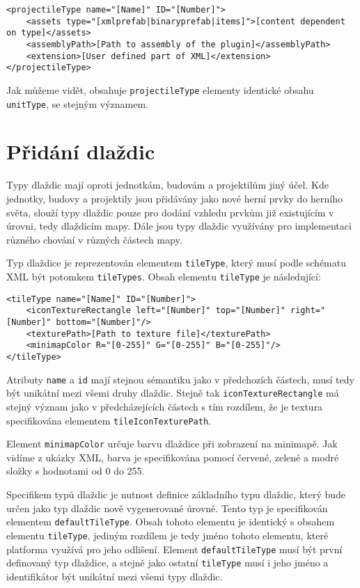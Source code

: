 \begin{lstlisting}
<projectileType name="[Name]" ID="[Number]">
	<assets type="[xmlprefab|binaryprefab|items]">[content dependent on type]</assets>
	<assemblyPath>[Path to assembly of the plugin]</assemblyPath>
	<extension>[User defined part of XML]</extension>
</projectileType>
\end{lstlisting}

Jak můžeme vidět, obsahuje \texttt{projectileType} elementy identické obsahu \texttt{unitType}, se stejným významem.
\section{Přidání dlaždic}
Typy dlaždic mají oproti jednotkám, budovám a projektilům jiný účel. Kde jednotky, budovy a projektily jsou přidávány jako nové herní prvky do herního světa, slouží typy dlaždic pouze pro dodání vzhledu prvkům již existujícím v úrovni, tedy dlaždicím mapy. Dále jsou typy dlaždic využívány pro implementaci různého chování v různých částech mapy. 

Typ dlaždice je reprezentován elementem \texttt{tileType}, který musí podle schématu XML být potomkem \texttt{tileTypes}. Obsah elementu \texttt{tileType} je následující:
\begin{lstlisting}
<tileType name="[Name]" ID="[Number]">
	<iconTextureRectangle left="[Number]" top="[Number]" right="[Number]" bottom="[Number]"/>
	<texturePath>[Path to texture file]</texturePath>
	<minimapColor R="[0-255]" G="[0-255]" B="[0-255]"/>
</tileType>
\end{lstlisting}

Atributy \texttt{name} a \texttt{id} mají stejnou sémantiku jako v předchozích částech, musí tedy být unikátní mezi všemi druhy dlaždic. Stejně tak \texttt{iconTextureRectangle} má stejný význam jako v předcházejících částech s tím rozdílem, že je textura specifikována elementem \texttt{tileIconTexturePath}.

Element \texttt{minimapColor} určuje barvu dlaždice při zobrazení na minimapě. Jak vidíme z ukázky XML, barva je specifikována pomocí červené, zelené a modré složky s hodnotami od 0 do 255.

Specifikem typů dlaždic je nutnost definice základního typu dlaždic, který bude určen jako typ dlaždic nově vygenerované úrovně. Tento typ je specifikován elementem \texttt{defaultTileType}. Obsah tohoto elementu je identický s obsahem elementu \texttt{tileType}, jediným rozdílem je tedy jméno tohoto elementu, které platforma využívá pro jeho odlišení. Element \texttt{defaultTileType} musí být první definovaný typ dlaždice, a stejně jako ostatní \texttt{tileType} musí i jeho jméno a identifikátor být unikátní mezi všemi typy dlaždic.
